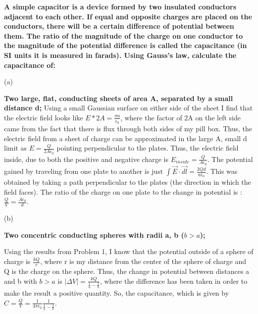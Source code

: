 \begin{homeworkProblem}
\textbf{A simple capacitor is a device formed by two insulated conductors adjacent to each 
other. If equal and opposite charges are placed on the conductors, there will be a 
certain difference of potential between them. The ratio of the magnitude of the 
charge on one conductor to the magnitude of the potential difference is called the 
capacitance (in SI units it is measured in farads). Using Gauss's law, calculate the 
capacitance of: }

\begin{homeworkSection}{(a)}

\textbf{Two large, flat, conducting sheets of area A, separated by a small distance d; 
}
Using a small Gaussian surface on either side of the sheet I find that the electric field looks like $E * 2A = \frac{\sigma a}{\epsilon_0}$, where the factor of 2A on the left side came from the fact that there is flux through both sides of my pill box. Thus, the electric field from a sheet of charge can be approximated in the large A, small d limit as $E = \frac{Q}{2 A \epsilon_0}$ pointing perpendicular to the plates. Thus, the electric field inside, due to both the positive and negative charge is $E_{inside} = \frac{Q}{A \epsilon_0}$. The potential gained by traveling from one plate to another is just $\int \vec{E}\cdot \vec{dl} = \frac{2Q d}{a \epsilon_0}$. This was obtained by taking a path perpendicular to the plates (the direction in which the field faces). The ratio of the charge on one plate to the change in potential is : $\frac{Q}{V} = \frac{A \epsilon_0}{d}$.

\end{homeworkSection}

\begin{homeworkSection}{(b)}

\textbf{Two concentric conducting spheres with radii a, b ($b > a$); }

Using the results from Problem 1, I know that the potential outside of a sphere of charge is $\frac{k Q}{r}$, where r is my distance from the center of the sphere of charge and Q is the charge on the sphere. Thus, the change in potential between distances a and b with $ b > a $ is $|\Delta V| = \frac{k Q}{\frac{1}{a} - \frac{1}{b}}$, where the difference has been taken in order to make the result a positive quantity. So, the capacitance, which is given by $ C = \frac{Q}{V} = \frac{1}{4\pi \epsilon_0}\frac{1}{\frac{1}{a}-\frac{1}{b}} $.

\end{homeworkSection}


\end{homeworkProblem}
